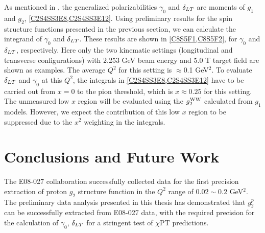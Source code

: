
As mentioned in , the generalized polarizabilities $\gamma_0$ and $\delta_{LT}$ are moments of $g_1$ and $g_2$, \cref{C2S4SS3E8,C2S4SS3E12}. Using preliminary results for the spin structure functions presented in the previous section, we can calculate the integrand of $\gamma_0$ and $\delta_{LT}$. These results are shown in \cref{C8S5F1,C8S5F2}, for $\gamma_0$ and $\delta_{LT}$, respectively. Here only the two kinematic settings (longitudinal and transverse configurations) with 2.253 GeV beam energy and 5.0 T target field are shown as examples. The average $Q^2$ for this setting is $\approx$0.1 GeV${}^2$. To evaluate $\delta_{LT}$ and $\gamma_0$ at this $Q^2$, the integrals in \cref{C2S4SS3E8,C2S4SS3E12} have to be carried out from $x=0$ to the pion threshold, which is $x\approx0.25$ for this setting. The unmeasured low $x$ region will be evaluated using the $g_2^{\mathrm{WW}}$ calculated from $g_1$ models. However, we expect the contribution of this low $x$ region to be suppressed due to the $x^2$ weighting in the integrals.


\section{Conclusions and Future Work}
\label{C8S6}

The E08-027 collaboration successfully collected data for the first precision extraction of proton $g_2$ structure function in the $Q^2$ range of $0.02\sim0.2$ GeV${}^2$. The preliminary data analysis presented in this thesis has demonstrated that $g_2^p$ can be successfully extracted from E08-027 data, with the required precision for the calculation of $\gamma_0$, $\delta_{LT}$ for a stringent test of $\chi$PT predictions.

